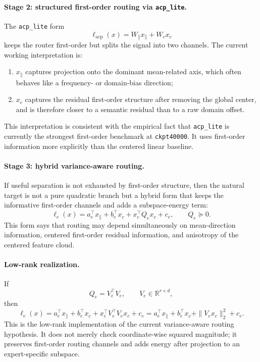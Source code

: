 \documentclass[11pt]{article}
\begin{document}
\paragraph{Stage 2: structured first-order routing via \texttt{acp\_lite}.}
The \texttt{acp\_lite} form
\[
\ell_{\mathrm{acp}}(x)=W_{\parallel}x_{\parallel}+W_c x_c
\]
keeps the router first-order but splits the signal into two channels. The current working interpretation is:
\begin{enumerate}
    \item $x_{\parallel}$ captures projection onto the dominant mean-related axis, which often behaves like a frequency- or domain-bias direction;
    \item $x_c$ captures the residual first-order structure after removing the global center, and is therefore closer to a semantic residual than to a raw domain offset.
\end{enumerate}

This interpretation is consistent with the empirical fact that \texttt{acp\_lite} is currently the strongest first-order benchmark at \texttt{ckpt40000}. It uses first-order information more explicitly than the centered linear baseline.

\paragraph{Stage 3: hybrid variance-aware routing.}
If useful separation is not exhausted by first-order structure, then the natural target is not a pure quadratic branch but a hybrid form that keeps the informative first-order channels and adds a subspace-energy term:
\[
\ell_e(x)
=
a_e^\top x_{\parallel}
+
b_e^\top x_c
+
x_c^\top Q_e x_c
+
c_e,
\qquad
Q_e \succeq 0.
\]
This form says that routing may depend simultaneously on mean-direction information, centered first-order residual information, and anisotropy of the centered feature cloud.

\paragraph{Low-rank realization.}
If
\[
Q_e = V_e^\top V_e,
\qquad
V_e\in\mathbb{R}^{r\times d},
\]
then
\[
\ell_e(x)
=
a_e^\top x_{\parallel}
+
b_e^\top x_c
+
x_c^\top V_e^\top V_e x_c
+
c_e
=
a_e^\top x_{\parallel}
+
b_e^\top x_c
+
\|V_e x_c\|_2^2
+
c_e.
\]
This is the low-rank implementation of the current variance-aware routing hypothesis. It does not merely check coordinate-wise squared magnitude; it preserves first-order routing channels and adds energy after projection to an expert-specific subspace.
\end{document}
